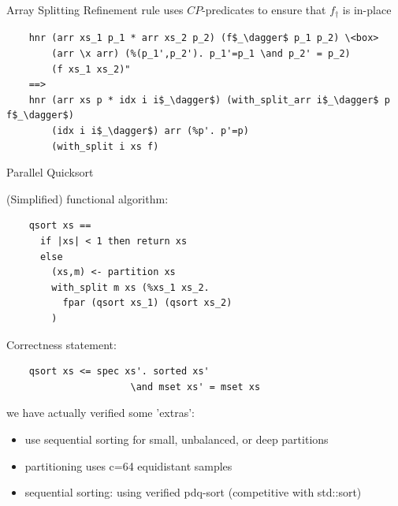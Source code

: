 \documentclass[fleqn]{beamer}
\begin{document}
\begin{frame}[fragile]{Array Splitting}
  Refinement rule uses $CP$-predicates to ensure that $f_\dagger$ is in-place


  \begin{lstlisting}
    hnr (arr xs_1 p_1 * arr xs_2 p_2) (f$_\dagger$ p_1 p_2) \<box>
        (arr \x arr) (%(p_1',p_2'). p_1'=p_1 \and p_2' = p_2)
        (f xs_1 xs_2)"
    ==>
    hnr (arr xs p * idx i i$_\dagger$) (with_split_arr i$_\dagger$ p f$_\dagger$)
        (idx i i$_\dagger$) arr (%p'. p'=p)
        (with_split i xs f)
  \end{lstlisting}


\end{frame}
\begin{frame}[fragile]{Parallel Quicksort}
  \begin{minipage}[t]{.49\textwidth}
  (Simplified) functional algorithm:
  \begin{lstlisting}
    qsort xs ==
      if |xs| < 1 then return xs
      else
        (xs,m) <- partition xs
        with_split m xs (%xs_1 xs_2.
          fpar (qsort xs_1) (qsort xs_2)
        )
  \end{lstlisting}
  \end{minipage}
  \begin{minipage}[t]{.49\textwidth}
  Correctness statement:
  \begin{lstlisting}
    qsort xs <= spec xs'. sorted xs'
                      \and mset xs' = mset xs
  \end{lstlisting}
  \end{minipage}

  \pause
  we have actually verified some 'extras':
  \begin{itemize}
   \item use sequential sorting for small, unbalanced, or deep partitions
   \item partitioning uses c=64 equidistant samples
   \item sequential sorting: using verified pdq-sort (competitive with std::sort)

  \end{itemize}
\end{frame}
\end{document}
